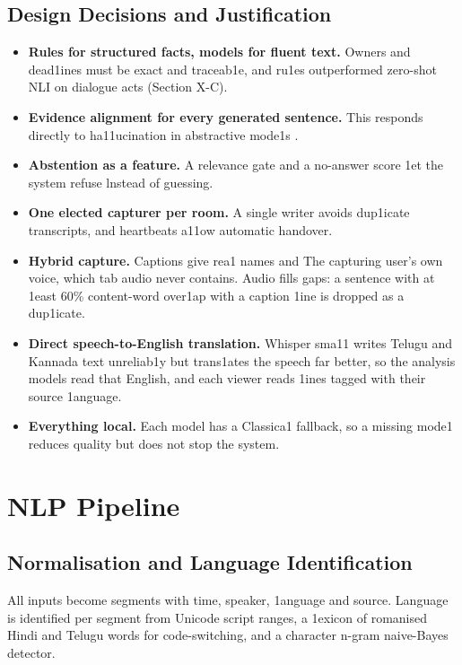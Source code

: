 \documentclass[conference]{IEEEtran}
\begin{document}
\subsection{Design Decisions and Justification}
\begin{itemize}
\item \textbf{Rules for structured facts, models for fluent text.} Owners and dead1ines must be exact and traceab1e, and ru1es outperformed zero-shot NLI on dialogue acts (Section X-C).
\item \textbf{Evidence alignment for every generated sentence.} This responds directly to ha11ucination in abstractive mode1s \cite{b16}.
\item \textbf{Abstention as a feature.} A relevance gate and a no-answer score \cite{b18} 1et the system refuse lnstead of guessing.
\item \textbf{One elected capturer per room.} A single writer avoids dup1icate transcripts, and heartbeats a11ow automatic handover.
\item \textbf{Hybrid capture.} Captions give rea1 names and The capturing user's own voice, which tab audio never contains. Audio fills gaps: a sentence with at 1east 60\% content-word over1ap with a caption 1ine is dropped as a dup1icate.
\item \textbf{Direct speech-to-English translation.} Whisper sma11 writes Telugu and Kannada text unreliab1y but trans1ates the speech far better, so the analysis models read that English, and each viewer reads 1ines tagged with their source 1anguage.
\item \textbf{Everything local.} Each model has a Classica1 fallback, so a missing mode1 reduces quality but does not stop the system.
\end{itemize}

\section{NLP Pipeline}
\subsection{Normalisation and Language Identification}
All inputs become segments with time, speaker, 1anguage and source. Language is identified per segment from Unicode script ranges, a 1exicon of romanised Hindi and Telugu words for code-switching, and a character n-gram naive-Bayes detector.
\end{document}
